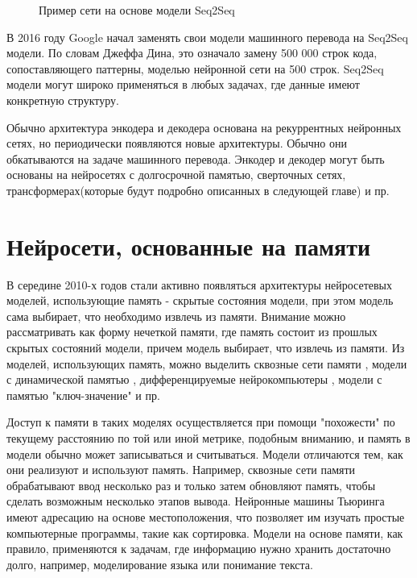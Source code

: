 \begin{figure}[ht]
  \caption{Пример сети на основе модели Seq2Seq}\label{fig:Neuro6-Seq2Seq}
\end{figure}


    В 2016 году Google начал заменять свои модели машинного перевода на Seq2Seq модели. По словам Джеффа Дина, это означало замену 500 000 строк кода, сопоставляющего паттерны,  моделью нейронной сети на 500 строк. Seq2Seq модели могут широко применяться в любых задачах, где данные имеют конкретную структуру.
    
Обычно архитектура энкодера и декодера основана на рекуррентных нейронных сетях, но периодически появляются новые архитектуры. Обычно они обкатываются на задаче машинного перевода. Энкодер и декодер могут быть основаны на нейросетях с долгосрочной памятью, сверточных сетях, трансформерах(которые будут подробно описанных в следующей главе) и пр.

\section{Нейросети, основанные на памяти}
В середине 2010-х годов стали активно появляться архитектуры нейросетевых моделей, использующие память - скрытые состояния модели, при этом модель сама выбирает, что необходимо извлечь из памяти. 
     Внимание можно рассматривать как форму нечеткой памяти, где память состоит из прошлых скрытых состояний модели, причем модель выбирает, что извлечь из памяти.  Из моделей, использующих память, можно выделить сквозные сети памяти \cite{sukhbaatar_2015}, модели с динамической памятью \cite{kumar_2016}, дифференцируемые нейрокомпьютеры \cite{graves_2016}, модели с памятью "ключ-значение" \cite{miller_2016} и пр.
 
     Доступ к памяти в таких моделях осуществляется при помощи "похожести" по текущему расстоянию по той или иной метрике, подобным вниманию, и память в модели обычно может записываться и считываться.  Модели отличаются тем, как они реализуют и используют память. Например, сквозные сети памяти обрабатывают ввод несколько раз и только затем обновляют память, чтобы сделать возможным несколько этапов вывода.  Нейронные машины Тьюринга имеют адресацию на основе местоположения, что позволяет им изучать простые компьютерные программы, такие как сортировка.  Модели на основе памяти, как правило, применяются к задачам, где информацию нужно хранить достаточно долго, например, моделирование языка или понимание текста.  
